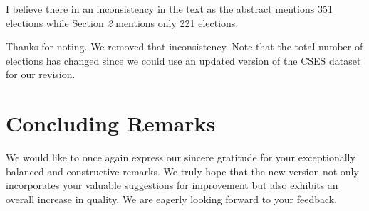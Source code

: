 \documentclass[a4paper, 12pt]{scrartcl}
\theoremstyle{break}
\newenvironment{changes}{\par\color{violet}\par\addvspace{\baselineskip}}{\par\addvspace{\baselineskip}}
\begin{document}
\begin{changes}
I believe there in an inconsistency in the text as the abstract mentions 351 elections while Section \emph{2} mentions only 221 elections.
\end{changes}

Thanks for noting. We removed that inconsistency. Note that the total number of elections has changed since we could use an updated version of the CSES dataset for our revision.

\section*{Concluding Remarks}
We would like to once again express our sincere gratitude for your exceptionally balanced and constructive remarks. We truly hope that the new version not only incorporates your valuable suggestions for improvement but also exhibits an overall increase in quality. We are eagerly looking forward to your feedback.
\end{document}
